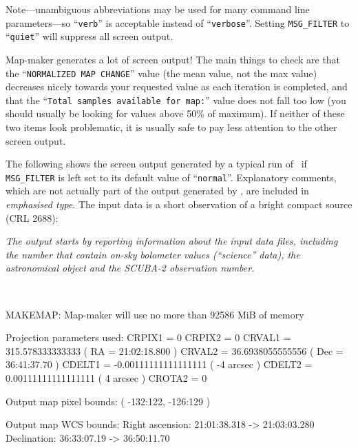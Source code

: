 
Note---unambiguous abbreviations may be used for many command line
parameters---so ``\texttt{verb}'' is acceptable instead of
``\texttt{verbose}''. Setting \texttt{MSG\_FILTER} to ``\texttt{quiet}''
will suppress all screen output.

\begin{tip}
  Map-maker generates a lot of screen output! The main things to check
  are that the ``\texttt{NORMALIZED MAP CHANGE}'' value (the mean value,
  not the max value) decreases nicely towards your requested
   value as each iteration is completed, and that
  the ``\texttt{Total samples available for map:}'' value does not fall
  too low (you should usually be looking for values above 50\% of
  maximum). If neither of these two items look problematic, it is usually
  safe to pay less attention to the other screen output.
\end{tip}

The following shows the screen output generated by a typical run of \makemap\
if \texttt{MSG\_FILTER} is left set to its default value of
``\texttt{normal}''. Explanatory comments, which are not actually
part of the output generated by \makemap, are included in \emph{emphasised
type}. The input data is a short observation of a bright compact source
(CRL 2688):


\emph{The output starts by reporting information about the input data files,
including the number that contain on-sky bolometer values (``science''
data), the astronomical object and the SCUBA-2 observation number.}

~
\begin{terminalv}

MAKEMAP: Map-maker will use no more than 92586 MiB of memory

   Projection parameters used:
      CRPIX1 = 0
      CRPIX2 = 0
      CRVAL1 = 315.578333333333 ( RA = 21:02:18.800 )
      CRVAL2 = 36.6938055555556 ( Dec = 36:41:37.70 )
      CDELT1 = -0.00111111111111111 ( -4 arcsec )
      CDELT2 = 0.00111111111111111 ( 4 arcsec )
      CROTA2 = 0

   Output map pixel bounds: ( -132:122, -126:129 )

   Output map WCS bounds:
        Right ascension: 21:01:38.318 -> 21:03:03.280
        Declination: 36:33:07.19 -> 36:50:11.70
\end{terminalv}

